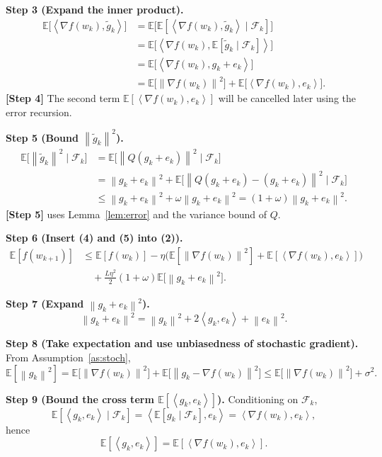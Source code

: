 \documentclass{article}
\newcommand{\E}{\mathbb{E}}
\newcommand{\norm}[1]{\left\lVert#1\right\rVert}
\newcommand{\ip}[2]{\left\langle#1,#2\right\rangle}
\begin{document}
\noindent\textbf{Step 3 (Expand the inner product).}  
\begin{align}
\E\!\big[\ip{\nabla f(w_k)}{\tilde g_k}\big]
&=\E\!\big[\E[\ip{\nabla f(w_k)}{\tilde g_k}\mid\mathcal{F}_k]\big]\nonumber\\
&=\E\!\big[\ip{\nabla f(w_k)}{\E[\tilde g_k\mid\mathcal{F}_k]}\big]\nonumber\\
&=\E\!\big[\ip{\nabla f(w_k)}{g_k+e_k}\big]\nonumber\\
&=\E\!\big[\norm{\nabla f(w_k)}^2\big]+\E\!\big[\ip{\nabla f(w_k)}{e_k}\big].
\tag{4}\label{eq:inner}
\end{align}
\noindent\textbf{[Step 4]} The second term $\E[\ip{\nabla f(w_k)}{e_k}]$ will be cancelled later using the error recursion.

\noindent\textbf{Step 5 (Bound $\norm{\tilde g_k}^2$).}  
\[
\begin{aligned}
\E\!\big[\norm{\tilde g_k}^2\mid\mathcal{F}_k\big]
&=\E\!\big[\norm{Q(g_k+e_k)}^2\mid\mathcal{F}_k\big]\\
&=\norm{g_k+e_k}^2
   +\E\!\big[\norm{Q(g_k+e_k)-(g_k+e_k)}^2\mid\mathcal{F}_k\big] \\
&\le \norm{g_k+e_k}^2+\omega\norm{g_k+e_k}^2
   =(1+\omega)\norm{g_k+e_k}^2 .
\end{aligned}
\tag{5}\label{eq:bound-tilde}
\]
\noindent\textbf{[Step 5]} uses Lemma~\ref{lem:error} and the variance bound of $Q$.

\noindent\textbf{Step 6 (Insert (4) and (5) into (2)).}
\[
\begin{aligned}
\E[f(w_{k+1})] &\le \E[f(w_k)]
 -\eta\Big(\E[\norm{\nabla f(w_k)}^2]
    +\E[\ip{\nabla f(w_k)}{e_k}]\Big)\\
&\quad+\frac{L\eta^2}{2}(1+\omega)\E\!\big[\norm{g_k+e_k}^2\big].
\end{aligned}
\tag{6}\label{eq:step6}
\]

\noindent\textbf{Step 7 (Expand $\norm{g_k+e_k}^2$).}
\[
\norm{g_k+e_k}^2=\norm{g_k}^2+2\ip{g_k}{e_k}+\norm{e_k}^2 .
\tag{7}\label{eq:expand}
\]

\noindent\textbf{Step 8 (Take expectation and use unbiasedness of stochastic gradient).}  
From Assumption~\ref{as:stoch},
\[
\E[\norm{g_k}^2]=\E\!\big[\norm{\nabla f(w_k)}^2\big]+\E\!\big[\norm{g_k-\nabla f(w_k)}^2\big]
\le \E\!\big[\norm{\nabla f(w_k)}^2\big]+\sigma^2 .
\tag{8}\label{eq:gradbound}
\]

\noindent\textbf{Step 9 (Bound the cross term $\E[\ip{g_k}{e_k}]$).}  
Conditioning on $\mathcal{F}_k$,
\[
\E[\ip{g_k}{e_k}\mid\mathcal{F}_k]
=\ip{\E[g_k\mid\mathcal{F}_k]}{e_k}
=\ip{\nabla f(w_k)}{e_k},
\]
hence
\[
\E[\ip{g_k}{e_k}]=\E[\ip{\nabla f(w_k)}{e_k}].
\tag{9}\label{eq:cross}
\]
\end{document}
